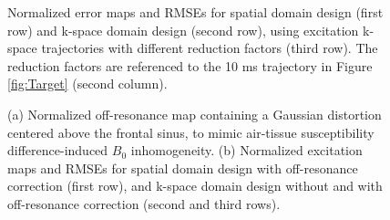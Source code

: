 \documentclass[11pt]{article}
\begin{document}
\begin{figure}
	\centering
	\caption{Normalized error maps and RMSEs for spatial domain design (first row) and k-space domain design (second row), 
	using excitation k-space trajectories with different reduction factors (third row).
	The reduction factors are referenced to the 10 ms trajectory in Figure \ref{fig:Target} (second column).}
	\label{fig:kspace_PTX_Acceleration}
\end{figure}


\begin{figure}
	\centering
	\caption{
	(a) Normalized off-resonance map containing a Gaussian distortion centered above the frontal sinus, 
	to mimic air-tissue susceptibility difference-induced $B_0$ inhomogeneity.
	(b) Normalized excitation maps and RMSEs for spatial domain design with off-resonance correction (first row), 
	and k-space domain design without and with off-resonance correction (second and third rows).}
	\label{fig:kspace_PTX_B0}
\end{figure}
\end{document}

